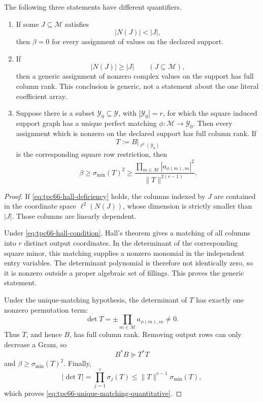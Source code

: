 \begin{theorem}
\label{thm:tpc66-support-rank-hierarchy}
The following three statements have different quantifiers.
\begin{enumerate}
\item If some \(J\subseteq\mathcal M\) satisfies
\begin{equation}
 |N(J)|<|J|,
 \label{eq:tpc66-hall-deficiency}
\end{equation}
then \(\beta=0\) for every assignment of values on the declared support.
\item If
\begin{equation}
 |N(J)|\ge|J|
 \qquad(J\subseteq\mathcal M),
 \label{eq:tpc66-hall-condition}
\end{equation}
then a generic assignment of nonzero complex values on the support has
full column rank.  This conclusion is generic, not a statement about the
one literal coefficient array.
\item Suppose there is a subset
\(\mathcal Y_0\subseteq\mathcal Y\), with
\(|\mathcal Y_0|=r\), for which the square induced support graph has a
unique perfect matching
\(\phi:\mathcal M\to\mathcal Y_0\).  Then every assignment which is
nonzero on the declared support has full column rank.  If
\[
 T:=B|_{\ell^2(\mathcal Y_0)}
 \]
is the corresponding square row restriction, then
\begin{equation}
 \boxed{
 \beta
 \ge\sigma_{\min}(T)^2
 \ge
 \frac{\displaystyle\prod_{m\in\mathcal M}
       |a_{\phi(m),m}|^2}
      {\|T\|^{2(r-1)}}.}
 \label{eq:tpc66-unique-matching-quantitative}
\end{equation}
\end{enumerate}
\end{theorem}

\begin{proof}
If \eqref{eq:tpc66-hall-deficiency} holds, the columns indexed by \(J\)
are contained in the coordinate space \(\ell^2(N(J))\), whose dimension is
strictly smaller than \(|J|\).  Those columns are linearly dependent.

Under \eqref{eq:tpc66-hall-condition}, Hall's theorem gives a matching of
all columns into \(r\) distinct output coordinates.  In the determinant of
the corresponding square minor, this matching supplies a nonzero monomial
in the independent entry variables.  The determinant polynomial is
therefore not identically zero, so it is nonzero outside a proper algebraic
set of fillings.  This proves the generic statement.

Under the unique-matching hypothesis, the determinant of \(T\) has exactly
one nonzero permutation term:
\[
 \det T
 =
 \pm\prod_{m\in\mathcal M}a_{\phi(m),m}\ne0.
\]
Thus \(T\), and hence \(B\), has full column rank.  Removing output rows can
only decrease a Gram, so
\[
 B^*B\succeq T^*T
\]
and \(\beta\ge\sigma_{\min}(T)^2\).  Finally,
\[
 |\det T|
 =\prod_{j=1}^r\sigma_j(T)
 \le\|T\|^{r-1}\sigma_{\min}(T),
\]
which proves \eqref{eq:tpc66-unique-matching-quantitative}.
\end{proof}

